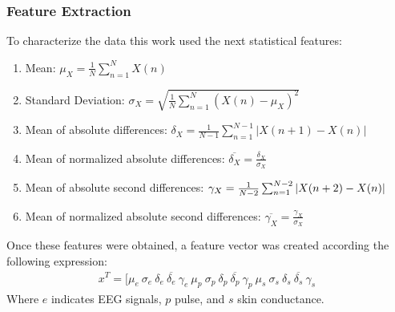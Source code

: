 \documentclass{sig-alternate}
\begin{document}

\subsubsection{Feature Extraction}

To characterize the data this work used the next statistical features:
\begin{enumerate}
\item Mean:  $\mu_{X} = \frac{1}{N}\sum^{N}_{n=1} X(n)$
\item Standard Deviation:  $\sigma_{X} = \sqrt{ \frac{1}{N}\sum^{N}_{n=1} (X(n)-\mu_{X})^{2} }$
\item Mean of absolute differences:  $\delta_{X} = \frac{1}{N-1} \sum^{N-1}_{n=1}|X(n+1)-X(n)|$
\item Mean of normalized absolute differences: $\overline{\delta_{X}} = \frac{\delta_{X}}{\sigma_{X}}$
\item Mean of absolute second differences:  $\gamma_{X} = \frac{1}{N-2} \\
 \sum^{N-2}_{n=1}|X(n+2)-X(n)|$
\item Mean of normalized absolute second differences: $\overline{\gamma_{X}} = \frac{\gamma_{X}}{\sigma_{X}}$
\end{enumerate}  

Once these features were obtained, a feature vector was created according the following 
expression:
\begin{equation}
\begin{split}
x^{T} = [\mu_{e}\ \sigma_{e}\ \delta_{e}\ \overline{\delta_{e}}\ \gamma_{e}\ %
\mu_{p}\ \sigma_{p}\ \delta_{p}\ \overline{\delta_{p}}\ \gamma_{p}\ %
\mu_{s}\ \sigma_{s}\ \delta_{s}\ \overline{\delta_{s}}\ \gamma_{s}\ %
\end{split}
\end{equation}
Where $e$ indicates EEG signals, $p$ pulse, and $s$ skin conductance.
\end{document}
